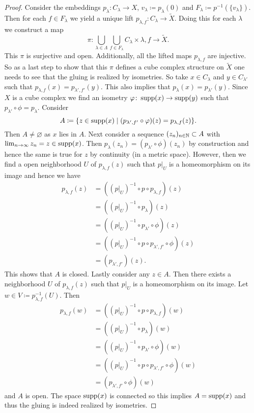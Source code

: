 \begin{proof}
  Consider the embeddings \(p_\lambda\colon C_\lambda \to X\), \(v_\lambda \coloneqq p_\lambda(0)\) and \(F_\lambda \coloneqq p^{-1}(\{v_\lambda\})\). Then for each \(f \in F_\lambda\) we yield a unique lift \(p_{\lambda, f}\colon C_\lambda \to \tilde X\).
  Doing this for each \(\lambda\) we construct a map
  \[
    \pi \colon \bigcup_{\lambda \in \Lambda} \bigcup_{f \in F_{\lambda}} C_\lambda \times {\lambda, f} \to \tilde X.
  \]
  This \(\pi\) is surjective and open. Additionally, all the lifted maps \(p_{\lambda, f}\) are injective. So as a last step to show that this \(\pi\) defines a cube complex structure on \(\tilde X\) one needs to see that the gluing is realized by isometries. So take \(x \in C_\lambda\) and \(y \in C_{\lambda'}\) such that \(p_{\lambda,f}(x) = p_{\lambda', f'}(y)\). This also implies that \(p_\lambda(x) = p_{\lambda'}(y)\). Since \(X\) is a cube complex we find an isometry \(\varphi\colon \operatorname{supp}(x) \to \operatorname{supp}(y)\) such that \(p_{\lambda'} \circ \phi  = p_\lambda\). Consider
  \[
    A \coloneqq \{z \in \operatorname{supp}(x) \mid (p_{\lambda', f'} \circ \varphi)(z) = p_{\lambda, f}(z)\}.
  \]
  Then \(A \neq \varnothing\) as \(x\) lies in \(A\). Next consider a sequence \((z_n)_{n \in \mathbb{N}} \subset A\) with \(\lim_{n \to \infty} z_n = z \in \operatorname{supp}(x)\). Then \(p_\lambda(z_n) = (p_{\lambda'} \circ \phi)(z_n)\) by construction and hence the same is true for \(z\) by continuity (in a metric space). However, then we find a open neighborhood \(U\) of \(p_{\lambda,f}(z)\) such that \(p|_U\) is a homeomorphism on its image and hence we have
  \begin{align*}
    p_{\lambda,f}(z)
    & = ((p|_U)^{-1} \circ p \circ p_{\lambda,f})(z)\\
    & = ((p|_U)^{-1} \circ p_\lambda)(z)\\
    & = ((p|_U)^{-1} \circ p_{\lambda'} \circ \phi)(z)\\
    & = ((p|_U)^{-1} \circ p \circ p_{\lambda',f'} \circ \phi)(z)\\
    & = (p_{\lambda', f'} )(z).
  \end{align*}
  This shows that \(A\) is closed. Lastly consider any \(z \in A\). Then there exists a neighborhood \(U\) of \(p_{\lambda, f}(z)\) such that \(p|_U\) is a homeomorphism on its image. Let \(w \in V \coloneqq p_{\lambda, f}^{-1}(U)\). Then
  \begin{align*}
    p_{\lambda,f}(w)
    & = ((p|_U)^{-1} \circ p \circ p_{\lambda,f})(w)\\
    & = ((p|_U)^{-1} \circ p_\lambda)(w)\\
    & = ((p|_U)^{-1} \circ p_{\lambda'} \circ \phi)(w)\\
    & = ((p|_U)^{-1} \circ p \circ p_{\lambda', f'} \circ \phi)(w)\\
    & = (p_{\lambda', f'} \circ \phi)(w)
  \end{align*}
  and \(A\) is open. The space \(\operatorname{supp}(x)\) is connected so this implies \(A = \operatorname{supp}(x)\) and thus the gluing is indeed realized by isometries.


\end{proof}
